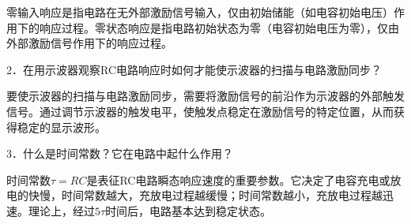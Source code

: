 \documentclass[12pt,a4paper]{article}
\begin{document}
零输入响应是指电路在无外部激励信号输入，仅由初始储能（如电容初始电压）作用下的响应过程。零状态响应是指电路初始状态为零（电容初始电压为零），仅由外部激励信号作用下的响应过程。


2．在用示波器观察RC电路响应时如何才能使示波器的扫描与电路激励同步？ 

要使示波器的扫描与电路激励同步，需要将激励信号的前沿作为示波器的外部触发信号。通过调节示波器的触发电平，使触发点稳定在激励信号的特定位置，从而获得稳定的显示波形。

3．什么是时间常数？它在电路中起什么作用？ 

时间常数$\tau=RC$是表征RC电路瞬态响应速度的重要参数。它决定了电容充电或放电的快慢，时间常数越大，充放电过程越缓慢；时间常数越小，充放电过程越迅速。理论上，经过$5\tau$时间后，电路基本达到稳定状态。
\end{document}
